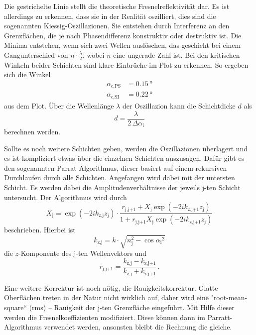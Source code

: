 Die gestrichelte Linie stellt die theoretische Fresnelreflektivität dar.
Es ist allerdings zu erkennen, dass sie in der Realität oszilliert, dies sind die sogenannten Kiessig-Oszillazionen. 
Sie entstehen durch Interferenz an den Grenzflächen, die je nach Phasendifferenz konstruktiv oder destruktiv ist.
Die Minima entstehen, wenn sich zwei Wellen auslöschen, das geschieht bei einem Gangunterschied von $ n \cdot \frac{\lambda}{2}$, wobei $n$ eine ungerade Zahl ist.
Bei den kritischen Winkeln beider Schichten sind klare Einbrüche im Plot zu erkennen. 
So ergeben sich die Winkel
\begin{align}
    \alpha _\text{c,PS} &= \SI{0.15}{\degree} \\
    \alpha _\text{c,SI} &= \SI{0.22}{\degree}
\end{align}
aus dem Plot.
Über die Wellenlänge $\lambda$ der Oszillazion kann die Schichtdicke $d$ als 
\begin{equation}
    d = \frac{\lambda}{2 \, \Delta \alpha _\text{i}}
    \label{eq:schicht}
\end{equation}
berechnen werden.

Sollte es noch weitere Schichten geben, werden die Oszillazionen überlagert und es ist kompliziert etwas über die einzelnen Schichten auszusagen.
Dafür gibt es den sogenannten Parrat-Algorithmus, dieser basiert auf einem rekursiven Durchlaufen durch alle Schichten.
Angefangen wird dabei mit der untersten Schicht.
Es werden dabei die Amplitudenverhältnisse der jeweils j-ten Schicht untersucht.
Der Algorithmus wird durch 
\begin{equation}
    X_\text{j} =  \exp(-2 i k_\text{z,j} z_\text{j}) \cdot  \frac{r_\text{j,j+1} + X_\text{j} \exp(-2 i k_\text{z,j+1} z_\text{j})}
    {1 + r_\text{j,j+1} X_\text{j} \exp(-2 i k_\text{z,j+1} z_\text{j})}
    \label{eq:parratt}
\end{equation}
beschrieben.
Hierbei ist
\begin{equation}
    k_\text{z,j} = k \cdot \sqrt{n_\text{j}^2 -  {\cos{\alpha _\text{i}}}^2}
    \label{eq:k}
\end{equation}
die $z$-Komponente des j-ten Wellenvektors und 
\begin{equation}
    r_\text{j,j+1} = \frac{k_\text{z,j} - k_\text{z,j+1}}{k_\text{z,j} + k_\text{z,j+1}} \,.
    \label{eq:k}
\end{equation}


Eine weitere Korrektur ist noch nötig, die Rauigkeitskorrektur. 
Glatte Oberflächen treten in der Natur nicht wirklich auf, daher wird eine "root-mean-square“ (rms) – Rauigkeit der j-ten Grenzfläche eingeführt.
Mit Hilfe dieser werden die Fresnelkoeffizienten modifiziert.
Diese können dann im Parratt-Algorithmus verwendet werden, ansonsten bleibt die Rechnung die gleiche.

